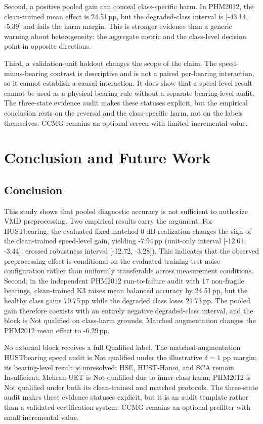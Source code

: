 \documentclass[11pt]{article}
\newcommand{\SI}[2]{#1\,\ensuremath{#2}}
\newcommand{\pp}{\mathrm{pp}}
\begin{document}
Second, a positive pooled gain can conceal class-specific harm. In PHM2012,
the clean-trained mean effect is \SI{24.51}{\pp}, but the degraded-class
interval is [-43.14, -5.39] and fails the harm margin. This is stronger
evidence than a generic warning about heterogeneity: the aggregate metric and
the class-level decision point in opposite directions.

Third, a validation-unit holdout changes the scope of the claim. The
speed-minus-bearing contrast is descriptive and is not a paired per-bearing
interaction, so it cannot establish a causal interaction. It does show that a
speed-level result cannot be used as a physical-bearing rule without a
separate bearing-level audit. The three-state evidence audit makes these
statuses explicit, but the empirical conclusion rests on the reversal and the
class-specific harm, not on the labels themselves. CCMG remains an optional
screen with limited incremental value.

\section{Conclusion and Future Work}

\subsection{Conclusion}

This study shows that pooled diagnostic accuracy is not sufficient to authorize
VMD preprocessing. Two empirical results carry the argument. For HUSTbearing,
the evaluated fixed matched 0 dB realization changes the sign of the
clean-trained speed-level gain, yielding \SI{-7.94}{\pp} (unit-only interval
[-12.61, -3.44]; crossed robustness interval [-12.72, -3.28]). This indicates
that the observed preprocessing effect is conditional on the evaluated
training-test noise configuration rather than uniformly transferable across
measurement conditions. Second, in the independent PHM2012 run-to-failure audit with 17
non-fragile bearings, clean-trained K3 raises mean balanced accuracy by
\SI{24.51}{\pp}, but the healthy class gains \SI{70.75}{\pp} while the degraded
class loses \SI{21.73}{\pp}. The pooled gain therefore coexists with an
entirely negative degraded-class interval, and the block is Not qualified on
class-harm grounds. Matched augmentation changes the PHM2012 mean effect to
\SI{-6.29}{\pp}.

No external block receives a full Qualified label. The matched-augmentation
HUSTbearing speed audit is Not qualified under the illustrative $\delta=1$ pp
margin; its bearing-level result is unresolved; HSE, HUST-Hanoi, and SCA remain
Insufficient; Mehran-UET is Not qualified due to inner-class harm; PHM2012 is
Not qualified under both its clean-trained and matched protocols. The
three-state audit makes these evidence statuses explicit, but it is an audit
template rather than a validated certification system. CCMG remains an optional
prefilter with small incremental value.
\end{document}
